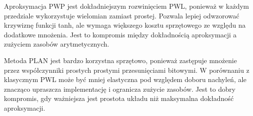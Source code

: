 \documentclass[12pt, a4paper, oneside]{scrreprt}
\begin{document}
Aproksymacja PWP jest dokładniejszym rozwinięciem PWL, ponieważ w każdym przedziale
wykorzystuje wielomian zamiast prostej. Pozwala lepiej odwzorować krzywiznę funkcji
tanh, ale wymaga większego kosztu sprzętowego ze względu na dodatkowe mnożenia.
Jest to kompromis między dokładnością aproksymacji a zużyciem zasobów arytmetycznych.

Metoda PLAN jest bardzo korzystna sprzętowo, ponieważ zastępuje mnożenie przez współczynniki
prostych prostymi przesunięciami bitowymi. W porównaniu z klasycznym PWL może być mniej
elastyczna pod względem doboru nachyleń, ale znacząco upraszcza implementację i ogranicza
zużycie zasobów. Jest to dobry kompromis, gdy ważniejsza jest prostota układu niż maksymalna
dokładność aproksymacji.




\printbibliography[title={Bibliografia}]
\end{document}
